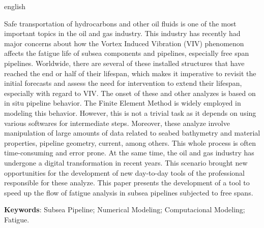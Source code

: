 \begin{resumo}[Abstract]
    \begin{otherlanguage*}{english}

        Safe transportation of hydrocarbons and other oil fluids is one of the most important topics in the oil and gas industry.
        This industry has recently had major concerns about how the Vortex Induced Vibration (VIV) phenomenon affects the fatigue life of subsea components and pipelines, especially free span pipelines.
        Worldwide, there are several of these installed structures that have reached the end or half of their lifespan, which makes it imperative to revisit the initial forecasts and assess the need for intervention to extend their lifespan, especially with regard to VIV.
        The onset of these and other analyzes is based on in situ pipeline behavior.
        The Finite Element Method is widely employed in modeling this behavior.
        However, this is not a trivial task as it depends on using various softwares for intermediate steps.
        Moreover, these analyze involve manipulation of large amounts of data related to seabed bathymetry and material properties, pipeline geometry, current, among others.
        This whole process is often time-consuming and error prone.
        At the same time, the oil and gas industry has undergone a digital transformation in recent years.
        This scenario brought new opportunities for the development of new day-to-day tools of the professional responsible for these analyze.
        This paper presents the development of a tool to speed up the flow of fatigue analysis in subsea pipelines subjected to free spans.

    \vspace{\onelineskip}

    \noindent
    \textbf{Keywords}: Subsea Pipeline; Numerical Modeling; Computacional Modeling; Fatigue.
    \end{otherlanguage*}
\end{resumo}